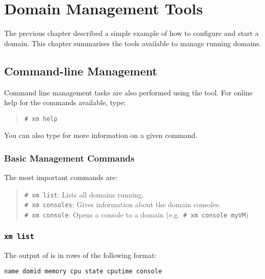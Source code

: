 \chapter{Domain Management Tools}

The previous chapter described a simple example of how to configure
and start a domain.  This chapter summarises the tools available to
manage running domains.


\section{Command-line Management}

Command line management tasks are also performed using the 
tool.  For online help for the commands available, type:
\begin{quote}
  \verb_# xm help_
\end{quote}

You can also type  for more information on
a given command.

\subsection{Basic Management Commands}

The most important  commands are:
\begin{quote}
  \verb_# xm list_: Lists all domains running.\\
  \verb_# xm consoles_: Gives information about the domain consoles.\\
  \verb_# xm console_: Opens a console to a domain (e.g.\
  \verb_# xm console myVM_)
\end{quote}

\subsection{\tt xm list}

The output of  is in rows of the following format:
\begin{center} {\tt name domid memory cpu state cputime console}
\end{center}

